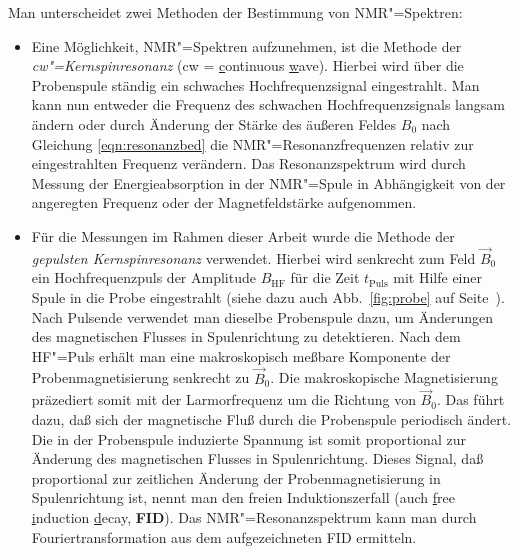 Man unterscheidet zwei Methoden der Bestimmung von NMR"=Spektren:
	\begin{itemize}
		\item Eine Möglichkeit, NMR"=Spektren aufzunehmen, ist die Methode der
			\emph{cw"=Kernspinresonanz} (cw = \ul{c}ontinuous
			\ul{w}ave). Hierbei wird über die Probenspule ständig ein schwaches Hochfrequenzsignal
			eingestrahlt. Man kann nun entweder die Frequenz des schwachen Hochfrequenzsignals
			langsam ändern oder durch Änderung der Stärke des äußeren Feldes $B_0$ nach Gleichung 
			\eqref{eqn:resonanzbed} die NMR"=Resonanzfrequenzen relativ zur eingestrahlten Frequenz
			verändern. Das Resonanzspektrum wird durch Messung der
			Energieabsorption in der NMR"=Spule in Abhängigkeit von der angeregten Frequenz oder
			der Magnetfeldstärke aufgenommen.
		\item Für die Messungen im Rahmen dieser Arbeit wurde die Methode der \emph{gepulsten
			Kernspinresonanz} verwendet. Hierbei wird senkrecht zum Feld $\vec B_0$ ein Hochfrequenzpuls
			der Amplitude $B_\mathrm{HF}$ für die Zeit $t_\mathrm{Puls}$ mit Hilfe einer Spule in die Probe eingestrahlt
			(siehe dazu auch Abb.~\ref{fig:probe} auf Seite~\pageref{fig:probe}).
			Nach Pulsende verwendet man dieselbe Probenspule dazu, um Änderungen
			des magnetischen Flusses in Spulenrichtung zu detektieren. Nach dem HF"=Puls erhält man
			eine makroskopisch meßbare Komponente der Probenmagnetisierung senkrecht zu $\vec
			B_0$. Die makroskopische Magnetisierung präzediert somit mit der Larmorfrequenz um die
			Richtung von $\vec B_0$. Das führt dazu, daß sich der magnetische Fluß durch die
			Probenspule periodisch ändert. Die in der Probenspule induzierte Spannung ist somit
			proportional zur Änderung des magnetischen Flusses in Spulenrichtung. Dieses Signal,
			daß proportional zur zeitlichen Änderung der Probenmagnetisierung in Spulenrichtung
			ist, nennt man den freien Induktionszerfall (auch \ul{f}ree \ul{i}nduction \ul{d}ecay,
			{\bfseries FID}). Das NMR"=Resonanzspektrum kann man durch Fouriertransformation aus
			dem aufgezeichneten FID ermitteln.
	\end{itemize}

